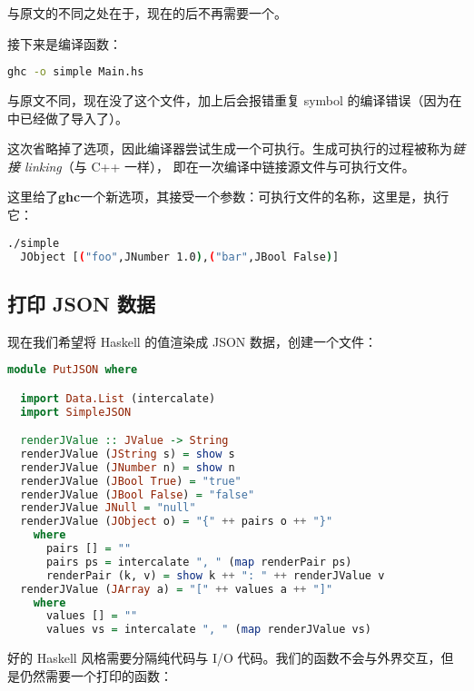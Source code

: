 \documentclass[./main.tex]{subfiles}
\begin{document}
与原文的不同之处在于，现在的后不再需要一个\acode{()}。

接下来是编译函数：

\begin{lstlisting}[language=Bash]
  ghc -o simple Main.hs
\end{lstlisting}

与原文不同，现在没了这个文件，加上后会报错重复
symbol 的编译错误（因为在中已经做了导入了）。

这次省略掉了选项，因此编译器尝试生成一个可执行。生成可执行的过程被称为\textit{链接 linking}（与 C++ 一样），
即在一次编译中链接源文件与可执行文件。

这里给了\textbf{ghc}一个新选项，其接受一个参数：可执行文件的名称，这里是，执行它：

\begin{lstlisting}[language=Bash]
  ./simple
  JObject [("foo",JNumber 1.0),("bar",JBool False)]
\end{lstlisting}

\subsection*{打印 JSON 数据}

现在我们希望将 Haskell 的值渲染成 JSON 数据，创建一个文件：

\begin{lstlisting}[language=Haskell]
  module PutJSON where

  import Data.List (intercalate)
  import SimpleJSON

  renderJValue :: JValue -> String
  renderJValue (JString s) = show s
  renderJValue (JNumber n) = show n
  renderJValue (JBool True) = "true"
  renderJValue (JBool False) = "false"
  renderJValue JNull = "null"
  renderJValue (JObject o) = "{" ++ pairs o ++ "}"
    where
      pairs [] = ""
      pairs ps = intercalate ", " (map renderPair ps)
      renderPair (k, v) = show k ++ ": " ++ renderJValue v
  renderJValue (JArray a) = "[" ++ values a ++ "]"
    where
      values [] = ""
      values vs = intercalate ", " (map renderJValue vs)
\end{lstlisting}

好的 Haskell 风格需要分隔纯代码与 I/O 代码。我们的函数不会与外界交互，但是仍然需要一个打印的函数：
\end{document}
